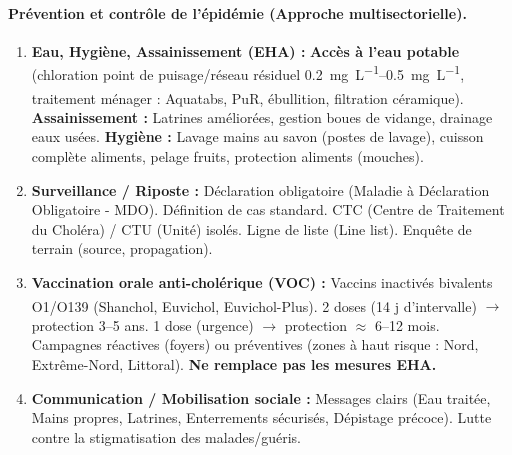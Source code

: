 \documentclass[11pt]{article}
\begin{document}
\paragraph{Prévention et contrôle de l'épidémie (Approche multisectorielle).}
\begin{enumerate}
    \item \textbf{Eau, Hygiène, Assainissement (EHA) :} \textbf{Accès à l'eau potable} (chloration point de puisage/réseau  résiduel \SIrange{0.2}{0.5}{\milli\gram\per\liter}, traitement ménager : Aquatabs\textsuperscript{\textregistered}, PuR\textsuperscript{\textregistered}, ébullition, filtration céramique). \textbf{Assainissement :} Latrines améliorées, gestion boues de vidange, drainage eaux usées. \textbf{Hygiène :} Lavage mains au savon (postes de lavage), cuisson complète aliments, pelage fruits, protection aliments (mouches).
    \item \textbf{Surveillance / Riposte :} Déclaration obligatoire (Maladie à Déclaration Obligatoire - MDO). Définition de cas standard. CTC (Centre de Traitement du Choléra) / CTU (Unité) isolés. Ligne de liste (Line list). Enquête de terrain (source, propagation).
    \item \textbf{Vaccination orale anti-cholérique (VOC) :} Vaccins inactivés bivalents O1/O139 (Shanchol\textsuperscript{\textregistered}, Euvichol\textsuperscript{\textregistered}, Euvichol-Plus\textsuperscript{\textregistered}). 2 doses (14 j d'intervalle) $\to$ protection 3--5 ans. 1 dose (urgence) $\to$ protection $\approx$ 6--12 mois. Campagnes réactives (foyers) ou préventives (zones à haut risque : Nord, Extrême-Nord, Littoral). \textbf{Ne remplace pas les mesures EHA.}
    \item \textbf{Communication / Mobilisation sociale :} Messages clairs (Eau traitée, Mains propres, Latrines, Enterrements sécurisés, Dépistage précoce). Lutte contre la stigmatisation des malades/guéris.
\end{enumerate}
\end{document}
